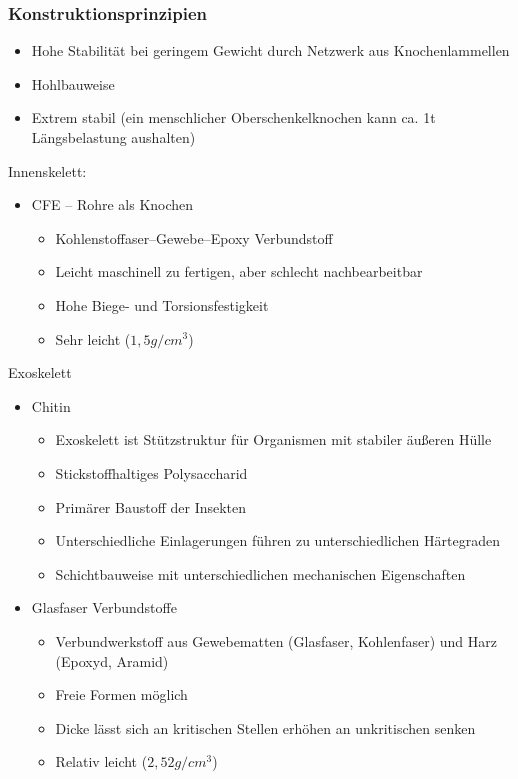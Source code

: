 \subsubsection{Konstruktionsprinzipien}
\begin{itemize}
	\item Hohe Stabilität bei geringem Gewicht durch Netzwerk aus Knochenlammellen
	\item Hohlbauweise
	\item Extrem stabil (ein menschlicher Oberschenkelknochen kann ca. 1t Längsbelastung aushalten)
\end{itemize}
Innenskelett:
\begin{itemize}
	\item CFE -- Rohre als Knochen
	\begin{itemize}
		\item Kohlenstoffaser--Gewebe--Epoxy Verbundstoff
		\item Leicht maschinell zu fertigen, aber schlecht nachbearbeitbar
		\item Hohe Biege- und Torsionsfestigkeit
		\item Sehr leicht ($1,5 g/cm^3$)
	\end{itemize}
\end{itemize}
Exoskelett
\begin{itemize}
	\item Chitin
	\begin{itemize}
		\item Exoskelett ist Stützstruktur für Organismen mit stabiler äußeren Hülle
		\item Stickstoffhaltiges Polysaccharid
		\item Primärer Baustoff der Insekten
		\item Unterschiedliche Einlagerungen führen zu unterschiedlichen Härtegraden
		\item Schichtbauweise mit unterschiedlichen mechanischen Eigenschaften
	\end{itemize}
	\item Glasfaser Verbundstoffe
	\begin{itemize}
		\item Verbundwerkstoff aus Gewebematten (Glasfaser, Kohlenfaser) und Harz (Epoxyd, Aramid)
		\item Freie Formen möglich
		\item Dicke lässt sich an kritischen Stellen erhöhen an unkritischen senken
		\item Relativ leicht ($2,52 g/cm^3$)
	\end{itemize}
\end{itemize}

